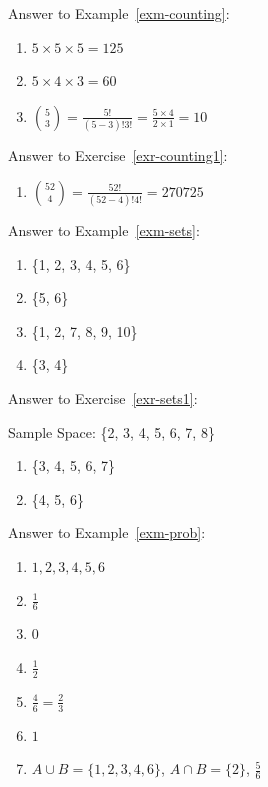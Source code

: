 \documentclass[
  letterpaper,
]{book}
\providecommand{\tightlist}{%
  \setlength{\itemsep}{0pt}\setlength{\parskip}{0pt}}\usepackage{longtable,booktabs,array}
\theoremstyle{definition}
\theoremstyle{definition}
\theoremstyle{plain}
\theoremstyle{definition}
\theoremstyle{plain}
\theoremstyle{plain}
\theoremstyle{remark}
\begin{document}
Answer to Example~\ref{exm-counting}:

\begin{enumerate}
\def\labelenumi{\arabic{enumi}.}
\item
  \(5 \times 5 \times 5 = 125\)
\item
  \(5 \times 4 \times 3 = 60\)
\item
  \(\binom{5}{3} = \frac{5!}{(5-3)!3!} = \frac{5 \times 4}{2 \times 1} = 10\)
\end{enumerate}

Answer to Exercise~\ref{exr-counting1}:

\begin{enumerate}
\def\labelenumi{\arabic{enumi}.}
\tightlist
\item
  \(\binom{52}{4} = \frac{52!}{(52-4)!4!} = 270725\)
\end{enumerate}

Answer to Example~\ref{exm-sets}:

\begin{enumerate}
\def\labelenumi{\arabic{enumi}.}
\tightlist
\item
  \{1, 2, 3, 4, 5, 6\}
\item
  \{5, 6\}
\item
  \{1, 2, 7, 8, 9, 10\}
\item
  \{3, 4\}
\end{enumerate}

Answer to Exercise~\ref{exr-sets1}:

Sample Space: \{2, 3, 4, 5, 6, 7, 8\}

\begin{enumerate}
\def\labelenumi{\arabic{enumi}.}
\tightlist
\item
  \{3, 4, 5, 6, 7\}
\item
  \{4, 5, 6\}
\end{enumerate}

Answer to Example~\ref{exm-prob}:

\begin{enumerate}
\def\labelenumi{\arabic{enumi}.}
\item
  \({1, 2, 3, 4, 5, 6}\)
\item
  \(\frac{1}{6}\)
\item
  \(0\)
\item
  \(\frac{1}{2}\)
\item
  \(\frac{4}{6} = \frac{2}{3}\)
\item
  \(1\)
\item
  \(A\cup B=\{1, 2, 3, 4, 6\}\), \(A\cap B=\{2\}\), \(\frac{5}{6}\)
\end{enumerate}
\end{document}
